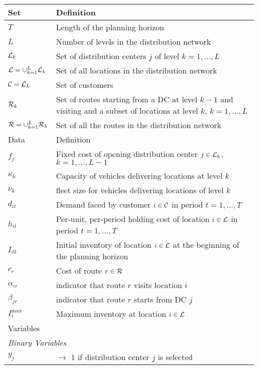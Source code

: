 \documentclass[a4paper,10pt]{article}
\begin{document}
\begin{linenumbers}
\begin{table}
    \centering
    \begin{tabular}{ll}
        \hline
        Set & Definition \\
        \hline
        $T$ & Length of the planning horizon\\
        $L$ & Number of levels in the distribution network\\
        $\mathcal{L}_k$ & Set of distribution centers $j$ of level $k=1, \ldots,L$ \\
        $\mathcal{L}=\cup_{k=1}^L \mathcal{L}_k$ & Set of all locations in the distribution network\\
        $\mathcal{C}=\mathcal{L}_L$ & Set of customers \\ 
        $\mathcal{R}_k$ & Set of routes starting from a DC at level $k-1$ and visiting and a subset of locations at level $k$, $k=1,\ldots,L$\\
        $\mathcal{R} = \cup_{k=1}^{L} \mathcal{R}_k$ & Set of all the routes in the distribution network\\
        \hline
        \hline
        Data & Definition \\
        \hline
        $f_j$ & Fixed cost of opening distribution center $j\in\mathcal{L}_k$, $k=1,\ldots,L-1$\\ 
        $\kappa_k$ & Capacity of vehicles delivering locations at level $k$\\ 
        $\nu_k$ & fleet size for vehicles delivering locations of level $k$\\ 
        $d_{it}$ & Demand faced by customer $i\in\mathcal{C}$ in period $t=1,\ldots,T$\\
        $h_{it}$ & Per-unit, per-period holding cost of location $i\in\mathcal{L}$ in period $t=1,\ldots, T$\\
        $I_{i0}$ & Initial inventory of location $i\in \mathcal{L}$ at the beginning of the planning horizon\\
        $c_r$ & Cost of route $r\in \mathcal{R}$\\
        $\alpha_{ir}$ & indicator that route $r$ visits location $i$\\
        $\beta_{jr}$ & indicator that route $r$ starts from DC $j$\\
        $I_i^{\max}$ & Maximum inventory at location $i\in\mathcal{L}$\\
        \hline
        \hline
        \multicolumn{2}{l}{Variables}\\
        \hline
        \multicolumn{2}{l}{\textit{Binary Variables}}\\
        $y_{j}$ & $\rightarrow$ 1 if distribution center $j$ is selected \\

\end{tabular}
\end{table}
\end{linenumbers}
\end{document}
